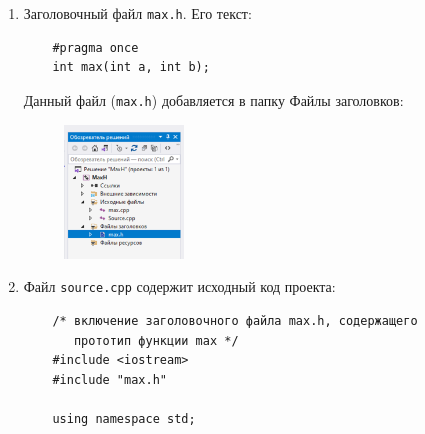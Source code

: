 \documentclass[14pt,a4paper]{article}
\begin{document}
\begin{enumerate}
  \item Заголовочный файл \texttt{max.h}. Его текст:
    \begin{verbatim}
    #pragma once
    int max(int a, int b);
    \end{verbatim}
    Данный файл (\texttt{max.h}) добавляется в папку Файлы заголовков:
    \begin{figure}[H]
      \includegraphics[width=0.3\textwidth]{data/condition20_1_1.png}
    \end{figure}
  \item Файл \texttt{source.cpp} содержит исходный код проекта:
    \begin{verbatim}
    /* включение заголовочного файла max.h, содержащего
       прототип функции max */
    #include <iostream>
    #include "max.h"
    
    using namespace std;
    

\end{verbatim}
\end{enumerate}
\end{document}
